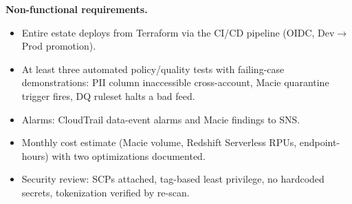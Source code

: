 \textbf{Non-functional requirements.}
\begin{itemize}
    \item Entire estate deploys from Terraform via the CI/CD pipeline (OIDC, Dev$\rightarrow$Prod promotion).
    \item At least three automated policy/quality tests with failing-case demonstrations: PII column inaccessible cross-account, Macie quarantine trigger fires, DQ ruleset halts a bad feed.
    \item Alarms: CloudTrail data-event alarms and Macie findings to SNS.
    \item Monthly cost estimate (Macie volume, Redshift Serverless RPUs, endpoint-hours) with two optimizations documented.
    \item Security review: SCPs attached, tag-based least privilege, no hardcoded secrets, tokenization verified by re-scan.
\end{itemize}

